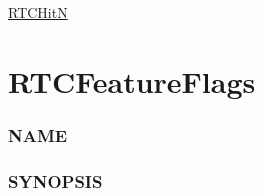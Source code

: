 \hyperref[rtchitn]{RTCHitN}

\pagebreak

\section{RTCFeatureFlags}\label{rtcfeatureflags}

\subsubsection{NAME}\label{name}

\begin{Shaded}
\begin{Highlighting}[]
\OperatorTok{{-}}
\end{Highlighting}
\end{Shaded}

\subsubsection{SYNOPSIS}\label{synopsis}

